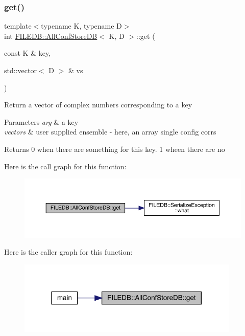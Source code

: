 \subsubsection{\texorpdfstring{get()}{get()}\hspace{0.1cm}{\footnotesize\ttfamily [3/3]}}
{\footnotesize\ttfamily template$<$typename K, typename D$>$ \\
int \mbox{\hyperlink{classFILEDB_1_1AllConfStoreDB}{F\+I\+L\+E\+D\+B\+::\+All\+Conf\+Store\+DB}}$<$ K, D $>$\+::get (\begin{DoxyParamCaption}\item[{const K \&}]{key,  }\item[{std\+::vector$<$ D $>$ \&}]{vs }\end{DoxyParamCaption})\hspace{0.3cm}{\ttfamily [inline]}}

Return a vector of complex numbers corresponding to a key 
\begin{DoxyParams}{Parameters}
{\em arg} & a key \\
\hline
{\em vectors} & user supplied ensemble -\/ here, an array single config corrs \\
\hline
\end{DoxyParams}
\begin{DoxyReturn}{Returns}
0 when there are something for this key. 1 wheen there are no 
\end{DoxyReturn}
Here is the call graph for this function\+:
\nopagebreak
\begin{figure}[H]
\begin{center}
\leavevmode
\includegraphics[width=350pt]{df/db6/classFILEDB_1_1AllConfStoreDB_a848466f7dce25cacc4e8560c50240d35_cgraph}
\end{center}
\end{figure}
Here is the caller graph for this function\+:
\nopagebreak
\begin{figure}[H]
\begin{center}
\leavevmode
\includegraphics[width=300pt]{df/db6/classFILEDB_1_1AllConfStoreDB_a848466f7dce25cacc4e8560c50240d35_icgraph}
\end{center}
\end{figure}
\mbox{\label{classFILEDB_1_1AllConfStoreDB_aeb8e6daf1a1f9b7a19899cf7db365632}} 
